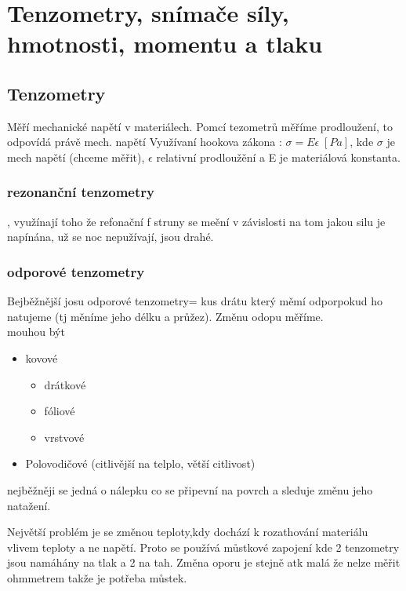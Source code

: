 \section{Tenzometry, snímače síly, hmotnosti, momentu a tlaku }
\subsection*{Tenzometry}
Měří mechanické napětí v materiálech.
Pomcí tezometrů měříme prodloužení, to odpovídá právě mech. napětí
Využívaní hookova zákona : $\sigma=E\epsilon \;[Pa]$, kde $\sigma$ je mech napětí (chceme měřit), $\epsilon$ relativní prodloužění a E je materiálová konstanta.

\subsubsection*{rezonanční tenzometry}, využínají toho že refonační f struny se meění v závislosti na tom jakou silu je napínána, už se noc nepužívají, jsou drahé.

\subsubsection*{odporové tenzometry}
Bejběžnější josu odporové tenzometry= kus drátu který měmí odporpokud ho natujeme (tj měníme jeho délku a průžez). Změnu odopu měříme.\\

mouhou být \begin{itemize}
    \item kovové
          \begin{itemize}
              \item drátkové
              \item fóliové
              \item vrstvové
          \end{itemize}
    \item Polovodičové (citlivější na telplo, větší citlivost)
\end{itemize}

nejběžněji se jedná o nálepku co se připevní na povrch a sleduje změnu jeho natažení.

Největší problém je se změnou teploty,kdy dochází k rozathování materiálu vlivem teploty a ne napětí. Proto se používá můstkové zapojení kde 2 tenzometry jsou namáhány na tlak a 2 na tah.
Změna oporu je stejně atk malá že nelze měřit ohmmetrem takže je potřeba můstek.



